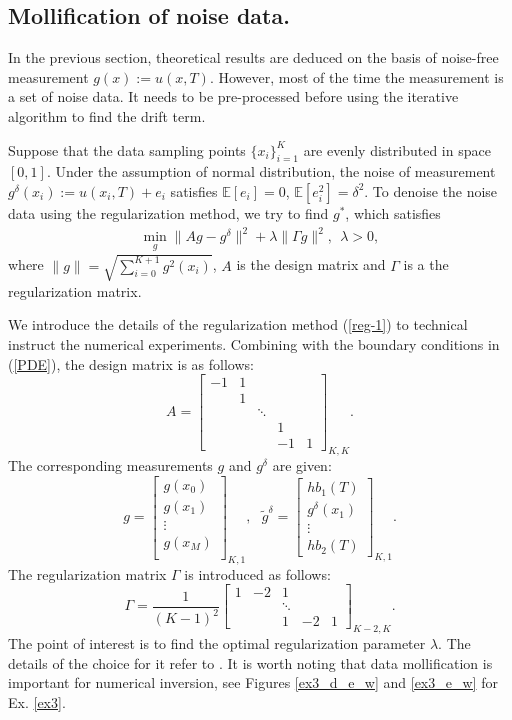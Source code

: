 \documentclass[11pt]{article}
\numberwithin{equation}{section}
\begin{document}
\subsection{Mollification of noise data.}
In the previous section, theoretical results are deduced on the basis of noise-free measurement $g(x):=u(x,T)$.
However, most of the time the measurement is a set of noise data. It needs to be pre-processed before using the iterative algorithm to find the drift term.

Suppose that the data sampling points $\{x_i\}_{i=1}^K$ are evenly distributed in space $[0,1]$. Under the assumption of normal distribution, the noise of measurement ${g^\delta(x_i)}:=u(x_i,T)+e_i$ satisfies $\mathbb{E}[e_i]=0$, $\mathbb{E}[e_i^2]=\delta^2$. 
To denoise the noise data using the regularization method, we try to find $g^*$, which satisfies 
\begin{align}\label{reg-1}
\min\limits_{g} \|Ag-g^\delta\|^2 + \lambda\|\Gamma g\|^2, ~~\lambda>0,   
\end{align}
where $\|g\|=\sqrt{\sum_{i=0}^{K+1}g^2(x_i)}$, $A$ is the design matrix and $\Gamma$ is a the regularization matrix. 

We introduce the details of the regularization method (\ref{reg-1}) to technical instruct the numerical experiments. 
Combining with the boundary conditions in (\ref{PDE}), the design matrix is as follows:
\[
A=\begin{bmatrix}
-1 &    1&       &   &    \\
  &    1 &       &   &    \\
  &      &   \ddots  &     \\
  &      &       &   1&   \\
  &      &       &  -1&  1
\end{bmatrix}_{K,K}.
\]
The corresponding measurements $g$ and $g^\delta$ are given:
\[
g=\begin{bmatrix}
g(x_0)      \\
g(x_1)      \\
\vdots      \\
g(x_M)      \\
\end{bmatrix}_{K,1},~~~
\tilde{g}^\delta=\begin{bmatrix}
 hb_1(T)   \\
g^\delta(x_1)  \\
\vdots      \\
 hb_2(T) 
\end{bmatrix}_{K,1}.
\]
The regularization matrix $\Gamma$ is introduced as follows:
\[
\Gamma=\frac{1}{(K-1)^2}\begin{bmatrix}
1  &    -2 &      1    &   &    \\
  &      &   \ddots    &     \\
  &      &       1&   -2&  1 
\end{bmatrix}_{K-2,K}.
\]
The point of interest is to find the optimal regularization parameter $\lambda$. The details of the choice for it refer to \cite{CenZhang:2025,ChenTuoZhang:2018}. It is worth noting that data mollification is important for numerical inversion, see Figures \ref{ex3_d_e_w} and \ref{ex3_e_w} for Ex. \ref{ex3}.  
\end{document}
